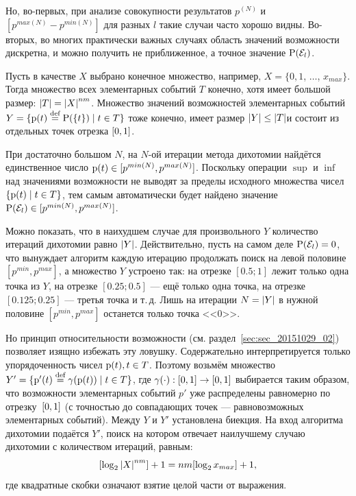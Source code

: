 Но, во-первых, при анализе совокупности результатов $p^{(N)}$ и $[p^{max(N)} - p^{min(N)}]$ для разных $l$ такие случаи часто хорошо видны. Во-вторых, во многих практически важных случаях область значений возможности дискретна, и можно получить не приближенное, а точное значение ${\mathrm{P}}(\mathcal{E}_l)$. 

Пусть в качестве $X$ выбрано конечное множество, например, $X = \{0, 1$, $\ldots$, $x_{max}\}$. Тогда множество всех элементарных событий $T$ конечно, хотя имеет большой размер: $\left| T \right| = \left| X \right|^{nm}$. Множество значений возможностей элементарных событий $Y = \{{\mathrm{p}}(t) \overset{\text{def}}{=} {\mathrm{P}}(\{t\})\mid t \in T\}$ тоже конечно, имеет размер $\left| Y \right| \leq \left| T \right|$и состоит из отдельных точек отрезка $[0,1]$. 

При достаточно большом $N$, на $N$-ой итерации метода дихотомии найдётся единственное число ${\mathrm{p}}(t)\in[p^{min(N)}, p^{max(N)}]$. Поскольку операции $\sup$ и $\inf$ над значениями возможности не выводят за пределы исходного множества чисел $\{{\mathrm{p}}(t) \mid t \in T\}$, тем самым автоматически будет найдено значение ${\mathrm{P}}(\mathcal{E}_l) \in [p^{min(N)}, p^{max(N)}]$.  

Можно показать, что в наихудшем случае для произвольного $Y$ количество итераций дихотомии равно $\left| Y \right|$. 
Действительно, пусть на самом деле ${\mathrm{P}}(\mathcal{E}_l) = 0$, что вынуждает алгоритм каждую итерацию продолжать поиск на левой половине $[p^{min}, p^{max}]$, а множество $Y$ устроено так: на отрезке $[0.5;  1]$ лежит только одна точка из $Y$, на отрезке $[0.25;  0.5]$ --- ещё только одна точка, на отрезке $[0.125;  0.25]$ --- третья точка и т.\,д. Лишь на итерации $N = \left| Y \right|$ в нужной половине $[p^{min}, p^{max}]$ останется только точка <<$0$>>. 

Но принцип относительности возможности (см. раздел~\ref{sec:sec_20151029_02}) позволяет изящно избежать эту ловушку. Содержательно интерпретируется только упорядоченность чисел ${\mathrm{p}}(t), t \in T$. Поэтому возьмём множество $Y' = \{{\mathrm{p}}'(t) \overset{\text{def}}{=} \gamma({\mathrm{p}}(t))\mid t \in T\}$, где $\gamma(\cdot): [0,1] \to [0,1]$ выбирается таким образом, что возможности элементарных событий $p'$ уже распределены равномерно по отрезку~$[0,1]$ (с точностью до совпадающих точек --- равновозможных элементарных событий). Между $Y$ и $Y'$ установлена биекция. На вход алгоритма дихотомии подаётся $Y'$, поиск на котором отвечает наилучшему случаю дихотомии с количеством итераций, равным:
\begin{equation*}
  \label{e:}
  [ \log_{2}{\left| X \right|^{nm}} ] + 1 = nm[ \log_{2}{x_{max}} ] + 1,
\end{equation*}
 где квадратные скобки означают взятие целой части от выражения.
 
